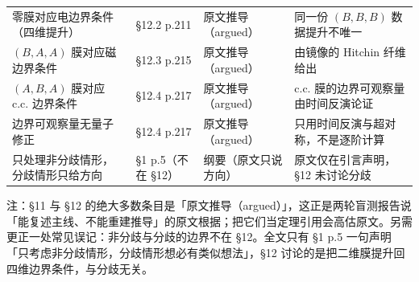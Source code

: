 \begin{longtable}{@{}p{4.5cm}p{2.9cm}p{3.2cm}p{4.3cm}@{}}
\addlinespace[3pt]
零膜对应电边界条件（四维提升） & \S12.2 p.211 & 原文推导（argued） & 同一份 $(B,B,B)$ 数据提升不唯一 \\
\addlinespace[3pt]
$(B,A,A)$ 膜对应磁边界条件 & \S12.3 p.215 & 原文推导（argued） & 由镜像的 Hitchin 纤维给出 \\
\addlinespace[3pt]
$(A,B,A)$ 膜对应 c.c. 边界条件 & \S12.4 p.217 & 原文推导（argued） & c.c. 膜的边界可观察量由时间反演论证 \\
\addlinespace[3pt]
边界可观察量无量子修正 & \S12.4 p.217 & 原文推导（argued） & 只用时间反演与超对称，不是逐阶计算 \\
\addlinespace[3pt]
只处理非分歧情形，分歧情形只给方向 & \S1 p.5（不在 \S12） & 纲要（原文只说方向） & 原文仅在引言声明，\S12 未讨论分歧 \\

\end{longtable}
\endgroup

注：\S11 与 \S12 的绝大多数条目是「原文推导（argued）」，这正是两轮盲测报告说「能复述主线、不能重建推导」的原文根据；把它们当定理引用会高估原文。另需更正一处常见误记：非分歧与分歧的边界不在 \S12。全文只有 \S1 p.5 一句声明「只考虑非分歧情形，分歧情形想必有类似想法」，\S12 讨论的是把二维膜提升回四维边界条件，与分歧无关。
